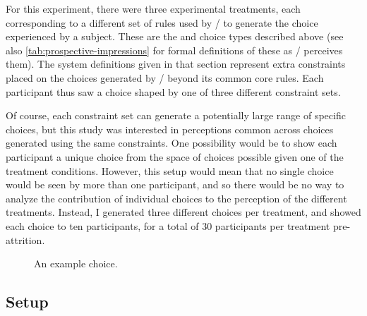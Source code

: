 For this experiment, there were three experimental treatments, each corresponding to a different set of rules used by \dunyazad/ to generate the choice experienced by a subject.
%
These are the \obv{,} \rlx{,} and \dlm{,} choice types described above (see also \cref{tab:prospective-impressions} for formal definitions of these as \dunyazad/ perceives them).
%
The system definitions given in that section represent extra constraints placed on the choices generated by \dunyazad/ beyond its common core rules.
%
Each participant thus saw a choice shaped by one of three different constraint sets.


Of course, each constraint set can generate a potentially large range of specific choices, but this study was interested in perceptions common across choices generated using the same constraints.
%
One possibility would be to show each participant a unique choice from the space of choices possible given one of the treatment conditions.
%
However, this setup would mean that no single choice would be seen by more than one participant, and so there would be no way to analyze the contribution of individual choices to the perception of the different treatments.
%
Instead, I generated three different choices per treatment, and showed each choice to ten participants, for a total of 30 participants per treatment pre-attrition.

\begin{figure}[!h]
  \caption{An example choice.}
  \label{fig:results-exchoice}
\end{figure}

\subsection{Setup}


